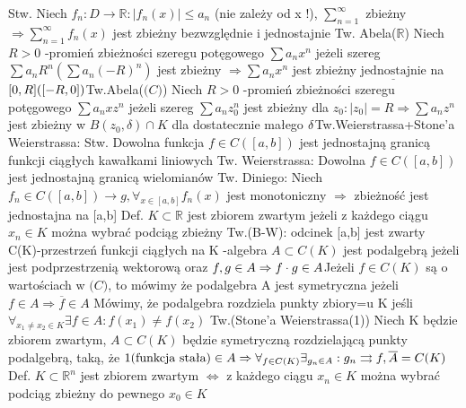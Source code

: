 \documentclass{article}
\begin{document}
Stw. Niech $f_n:D\rightarrow\mathbb{R}:|f_n(x)|\le a_n$ (nie zależy od x !), $\sum\limits_{n=1}^{\infty}$ zbieżny 
$\Rightarrow\sum\limits_{n=1}^{\infty}f_n(x)$ jest zbieżny bezwzględnie i jednostajnie\newline
Tw. Abela($\mathbb{R}$) Niech $R>0$ -promień zbieżności szeregu potęgowego $\sum a_nx^n$ jeżeli szereg $\sum a_nR^n(\sum a_n(-R)^n)$
jest zbieżny $\Rightarrow \sum a_nx^n $ jest zbieżny $\underline{\text{jednostajnie}}$ na $[0,R] ([-R,0])\newline
$Tw.Abela($\mathbb(C)$) Niech $R>0$ -promień zbieżności szeregu potęgowego $\sum a_nxz^n$ jeżeli szereg $\sum a_nz_0^n$ jest zbieżny dla $z_0:|z_0|=R
\Rightarrow \sum a_nz^n$ jest zbieżny w $B(z_0,\delta)\cap K$ dla dostatecznie małego $\delta\newline
$Tw.Weierstrassa+Stone'a Weierstrassa:\newline
Stw. Dowolna funkcja $f\in C([a,b])$ jest jednostajną granicą funkcji ciągłych kawałkami liniowych\newline
Tw. Weierstrassa: Dowolna $f\in C([a,b])$ jest jednostajną granicą wielomianów\newline
Tw. Diniego: Niech $f_n\in C([a,b])\rightarrow g, \forall_{x\in[a,b]}f_n(x)$ jest monotoniczny $\Rightarrow$ zbieżność jest jednostajna na [a,b]\newline
Def. $K\subset\mathbb{R}$ jest zbiorem zwartym jeżeli z każdego ciągu $x_n\in K$ można wybrać podciąg zbieżny\newline
Tw.(B-W): odcinek [a,b] jest zwarty\newline
C(K)-przestrzeń funkcji ciągłych na K -algebra\newline
$A\subset C(K)$ jest podalgebrą jeżeli jest podprzestrzenią wektorową oraz $f,g\in A\Rightarrow f\cdot g\in A\newline
$Jeżeli $f\in C(K)$ są o wartościach w $\mathbb(C)$, to mówimy że podalgebra A jest symetryczna jeżeli $f\in A\Rightarrow \overline{f}\in A$\newline
Mówimy, że podalgebra rozdziela punkty zbiory=u K jeśli $\forall_{x_1\neq x_2\in K}\exists f\in A : f(x_1)\neq f(x_2)$\newline
Tw.(Stone'a Weierstrassa(1)) Niech K będzie zbiorem zwartym, $A\subset C(K)$ będzie symetryczną rozdzielającą punkty podalgebrą, taką,
że $1(\text{funkcja stała})\in A \Rightarrow\forall_{f\in C(K)}\exists_{g_n\in A}:g_n\rightrightarrows f, \overline{A}=C(K)\newline
$Def. $K\subset \mathbb{R}^n$ jest zbiorem zwartym $\Leftrightarrow$ z każdego ciągu $x_n\in K$ można wybrać podciąg zbieżny do pewnego $x_0\in K$\newline
\end{document}
